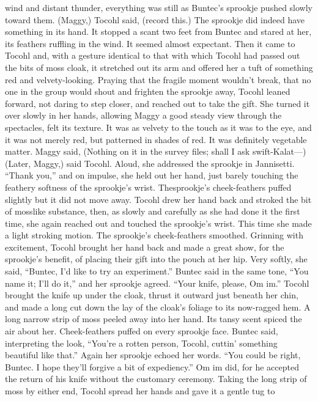 \documentclass[9pt]{article}
\begin{document}
wind and distant thunder, everything was still as Buntec’s sprookje pushed slowly toward them.
(Maggy,) Tocohl said, (record this.)
The sprookje did indeed have something in its hand.
It stopped a scant two feet from Buntec and stared at her, its feathers ruffling in the wind. It seemed
almost expectant. Then it came to Tocohl and, with a gesture identical to that with which Tocohl had
passed out the bits of moss cloak, it stretched out its arm and offered her a tuft of something red and
velvety-looking.
Praying that the fragile moment wouldn’t break, that no one in the group would shout and frighten the
sprookje away, Tocohl leaned forward, not daring to step closer, and reached out to take the gift. She
turned it over slowly in her hands, allowing Maggy a good steady view through the spectacles, felt its
texture. It was as velvety to the touch as it was to the eye, and it was not merely red, but patterned in
shades of red. It was definitely vegetable matter.
Maggy said, (Nothing on it in the survey files; shall I ask swift-Kalat—)
(Later, Maggy,) said Tocohl. Aloud, she addressed the sprookje in Jannisetti. “Thank you,” and on
impulse, she held out her hand, just barely touching the feathery softness of the sprookje’s wrist. Thesprookje’s cheek-feathers puffed slightly but it did not move away.
Tocohl drew her hand back and stroked the bit of mosslike substance, then, as slowly and carefully
as she had done it the first time, she again reached out and touched the sprookje’s wrist. This time she
made a light stroking motion. The sprookje’s cheek-feathers smoothed.
Grinning with excitement, Tocohl brought her hand back and made a great show, for the sprookje’s
benefit, of placing their gift into the pouch at her hip.
Very softly, she said, “Buntec, I’d like to try an experiment.”
Buntec said in the same tone, “You name it; I’ll do it,” and her sprookje agreed.
“Your knife, please, Om im.” Tocohl brought the knife up under the cloak, thrust it outward just
beneath her chin, and made a long cut down the lay of the cloak’s foliage to its now-ragged hem. A long
narrow strip of moss peeled away into her hand. Its tansy scent spiced the air about her.
Cheek-feathers puffed on every sprookje face. Buntec said, interpreting the look, “You’re a rotten
person, Tocohl, cuttin’ something beautiful like that.” Again her sprookje echoed her words.
“You could be right, Buntec. I hope they’ll forgive a bit of expediency.”
Om im did, for he accepted the return of his knife without the customary ceremony.
Taking the long strip of moss by either end, Tocohl spread her hands and gave it a gentle tug to
\end{document}
